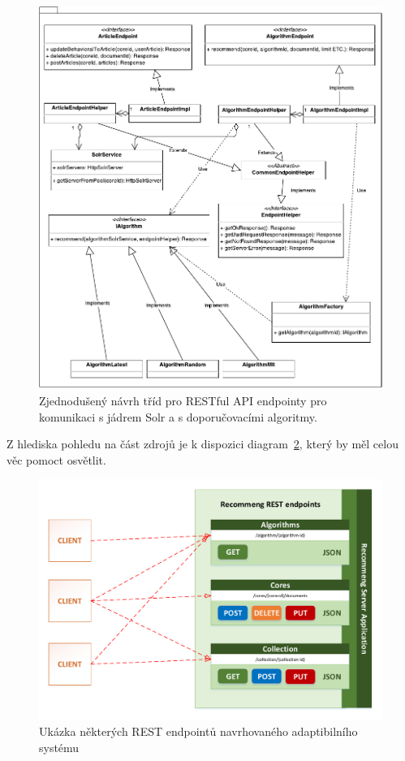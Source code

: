 \documentclass[thesis=M,czech]{FITthesis}[2014/05/07]
\begin{document}
\begin{figure}\centering
	\includegraphics[width=1.0\textwidth]{obr/rest2.pdf}
 	\caption[Zjednodušený návrh tříd pro RESTful API endpointy pro komunikaci s jádrem Solr a s doporučovacími algoritmy.]{Zjednodušený návrh tříd pro RESTful API endpointy pro komunikaci s jádrem Solr a s doporučovacími algoritmy.}\label{fig:recommengRestNavrh2}
\end{figure}	

Z hlediska pohledu na část zdrojů je k dispozici diagram~\ref{fig:rest}, který by měl celou věc pomoct osvětlit. 

\begin{figure}\centering
	\includegraphics[width=1.0\textwidth]{obr/DIPLOMKA_rest.pdf}
 	\caption[Ukázka některých REST endpointů navrhovaného adaptibilního systému]{Ukázka některých REST endpointů navrhovaného adaptibilního systému}\label{fig:rest}
\end{figure}	
\end{document}
